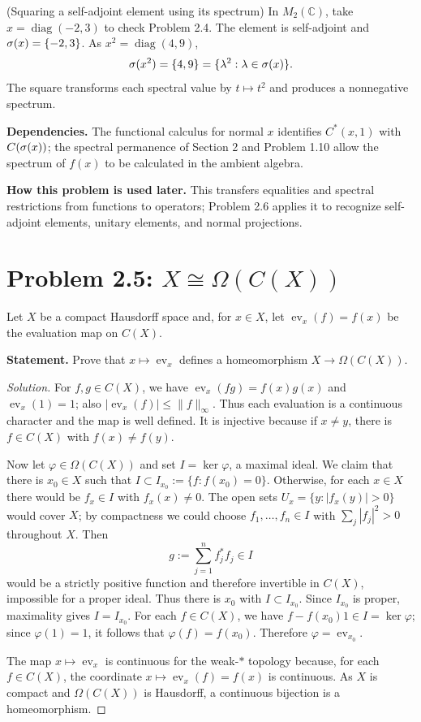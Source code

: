 \begin{cthejemplo}{(Squaring a self-adjoint element using its spectrum)}
In $M_2(\mathbb C)$, take $x=\operatorname{diag}(-2,3)$ to check Problem 2.4.
The element is self-adjoint and $\sigma(x)=\{-2,3\}$.
As $x^2=\operatorname{diag}(4,9)$,
\[
 \sigma(x^2)=\{4,9\}=\{\lambda^2:\lambda\in\sigma(x)\}.
\]
The square transforms each spectral value by $t\mapsto t^2$ and produces a nonnegative spectrum.
\end{cthejemplo}

\noindent\textbf{Dependencies.} The functional calculus for normal $x$ identifies $C^*(x,1)$ with $C(\sigma(x))$; the spectral permanence of Section 2 and Problem 1.10 allow the spectrum of $f(x)$ to be calculated in the ambient algebra.

\noindent\textbf{How this problem is used later.} This transfers equalities and spectral restrictions from functions to operators; Problem 2.6 applies it to recognize self-adjoint elements, unitary elements, and normal projections.

\section{Problem 2.5: \texorpdfstring{$X\cong\Omega(C(X))$}{X is homeomorphic to Omega(C(X))}}

Let $X$ be a compact Hausdorff space and, for $x\in X$, let
$\operatorname{ev}_x(f)=f(x)$ be the evaluation map on $C(X)$.

\noindent\textbf{Statement.} Prove that $x\mapsto\operatorname{ev}_x$ defines a homeomorphism $X\to\Omega(C(X))$.

\begin{proof}[Solution]
For $f,g\in C(X)$, we have
$\operatorname{ev}_x(fg)=f(x)g(x)$ and $\operatorname{ev}_x(1)=1$;
also $|\operatorname{ev}_x(f)|\le\|f\|_\infty$. Thus each evaluation is a continuous character
and the map is well defined. It is injective because
if $x\neq y$, there is $f\in C(X)$ with $f(x)\neq f(y)$.

Now let $\varphi\in\Omega(C(X))$ and set $I=\ker\varphi$, a maximal ideal. We claim that there is
$x_0\in X$ such that $I\subset I_{x_0}:=\{f:f(x_0)=0\}$. Otherwise, for each $x\in X$ there would be
$f_x\in I$ with $f_x(x)\neq0$. The open sets
$U_x=\{y:|f_x(y)|>0\}$ would cover $X$; by compactness we could choose
$f_1,\dots,f_n\in I$ with $\sum_j|f_j|^2>0$ throughout $X$. Then
\[
 g:=\sum_{j=1}^n f_j^*f_j\in I
\]
would be a strictly positive function and therefore invertible in $C(X)$, impossible for a proper ideal. Thus there is $x_0$ with $I\subset I_{x_0}$. Since $I_{x_0}$ is proper, maximality gives
$I=I_{x_0}$. For each $f\in C(X)$, we have $f-f(x_0)1\in I=\ker\varphi$; since
$\varphi(1)=1$, it follows that $\varphi(f)=f(x_0)$. Therefore
$\varphi=\operatorname{ev}_{x_0}$.

The map $x\mapsto\operatorname{ev}_x$ is continuous for the weak-$*$ topology because, for each
$f\in C(X)$, the coordinate $x\mapsto\operatorname{ev}_x(f)=f(x)$ is continuous. As $X$ is compact
and $\Omega(C(X))$ is Hausdorff, a continuous bijection is a homeomorphism.
\end{proof}

